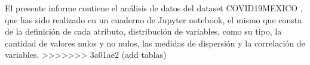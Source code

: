 \documentclass[
	spanish, %
	a4paper, oneside
]{article}
\begin{document}
	
\templatePortrait

\templatePagecfg

\begin{abstractd}
El presente informe contiene el análisis de datos del dataset COVID19MEXICO \cite{Salud} , que has sido realizado en un cuaderno de Jupyter notebook, el mismo que consta de la definición de cada atributo, distribución de variables, como su tipo, la cantidad de valores nulos  y no nulos, las medidas de dispersión y la correlación de variables.  
>>>>>>> 3a01ae2 (add tablas)
\end{abstractd}

\templateIndex

\templateFinalcfg



\end{document}
